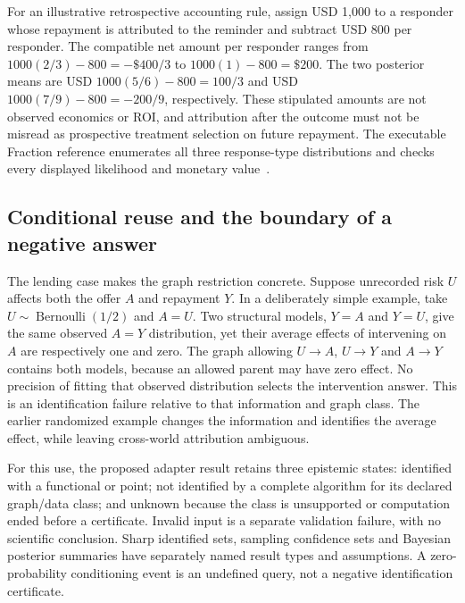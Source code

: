 For an illustrative retrospective accounting rule, assign USD 1,000 to a responder whose repayment is attributed to the reminder and subtract USD 800 per responder. The compatible net amount per responder ranges from $1000(2/3)-800=-\$400/3$ to $1000(1)-800=\$200$. The two posterior means are USD $1000(5/6)-800=100/3$ and USD $1000(7/9)-800=-200/9$, respectively. These stipulated amounts are not observed economics or ROI, and attribution after the outcome must not be misread as prospective treatment selection on future repayment. The executable Fraction reference enumerates all three response-type distributions and checks every displayed likelihood and monetary value~\citep{exec18_rid_exact}.

\subsection{Conditional reuse and the boundary of a negative answer}

The lending case makes the graph restriction concrete. Suppose unrecorded risk $U$ affects both the offer $A$ and repayment $Y$. In a deliberately simple example, take $U\sim\operatorname{Bernoulli}(1/2)$ and $A=U$. Two structural models, $Y=A$ and $Y=U$, give the same observed $A=Y$ distribution, yet their average effects of intervening on $A$ are respectively one and zero. The graph allowing $U\to A$, $U\to Y$ and $A\to Y$ contains both models, because an allowed parent may have zero effect. No precision of fitting that observed distribution selects the intervention answer. This is an identification failure relative to that information and graph class. The earlier randomized example changes the information and identifies the average effect, while leaving cross-world attribution ambiguous.

For this use, the proposed adapter result retains three epistemic states: identified with a functional or point; not identified by a complete algorithm for its declared graph/data class; and unknown because the class is unsupported or computation ended before a certificate. Invalid input is a separate validation failure, with no scientific conclusion. Sharp identified sets, sampling confidence sets and Bayesian posterior summaries have separately named result types and assumptions. A zero-probability conditioning event is an undefined query, not a negative identification certificate.


